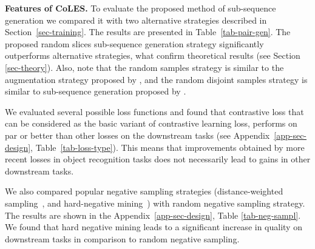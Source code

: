 \documentclass{article}
\begin{document}
\textbf{Features of CoLES.} To evaluate the proposed method of sub-sequence generation we compared it with two alternative strategies described in Section~\ref{sec-training}. The results are presented in Table~\ref{tab-pair-gen}. The proposed random slices sub-sequence generation strategy significantly outperforms alternative strategies, what confirm theoretical results (see Section \ref{sec-theory}). Also, note that the random samples strategy is similar to the augmentation strategy proposed by \cite{Yao2020SelfsupervisedLF}, and the random disjoint samples strategy is similar to sub-sequence generation proposed by \cite{Ma2020DisentangledSI}.

We evaluated several possible loss functions and found that contrastive loss that can be considered as the basic variant of contrastive learning loss, performs on par or better than other losses on the downstream tasks (see Appendix~\ref{app-sec-design}, Table~\ref{tab-loss-type}). This means that improvements obtained by more recent losses in object recognition tasks does not necessarily lead to gains in other downstream tasks.

We also compared popular negative sampling strategies (distance-weighted sampling~\citep{Manmatha2017SamplingMI}, and hard-negative mining~\citep{Schroff2015FaceNetAU}) with random negative sampling strategy. The results are shown in the Appendix~\ref{app-sec-design}, Table \ref{tab-neg-sampl}. We found that hard negative mining leads to a significant increase in quality on downstream tasks in comparison to random negative sampling.
\end{document}
